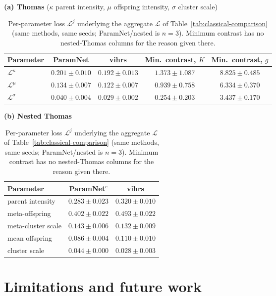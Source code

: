 \documentclass[11pt,a4paper]{article}
\begin{document}
\begin{table}[tbp]
\centering
\small
\textbf{(a) Thomas} ($\kappa$ parent intensity, $\mu$ offspring intensity, $\sigma$ cluster scale)\\[2pt]
\begin{tabular}{lcccc}
\toprule
Parameter & ParamNet & vihrs & Min.\ contrast, $K$ & Min.\ contrast, $g$ \\
\midrule
$\mathcal{L}^\kappa$ & $0.201 \pm 0.010$ & $0.192 \pm 0.013$ & $1.373 \pm 1.087$ & $8.825 \pm 0.485$ \\
$\mathcal{L}^\mu$    & $0.134 \pm 0.007$ & $0.122 \pm 0.007$ & $0.939 \pm 0.758$ & $6.334 \pm 0.370$ \\
$\mathcal{L}^\sigma$ & $0.040 \pm 0.004$ & $0.029 \pm 0.002$ & $0.254 \pm 0.203$ & $3.437 \pm 0.170$ \\
\bottomrule
\end{tabular}

\vspace{10pt}
\textbf{(b) Nested Thomas}\\[2pt]
\begin{tabular}{lcc}
\toprule
Parameter & ParamNet$^{c}$ & vihrs \\
\midrule
parent intensity      & $0.283 \pm 0.023$ & $0.320 \pm 0.010$ \\
meta-offspring        & $0.402 \pm 0.022$ & $0.493 \pm 0.022$ \\
meta-cluster scale    & $0.143 \pm 0.006$ & $0.132 \pm 0.009$ \\
mean offspring        & $0.086 \pm 0.004$ & $0.110 \pm 0.010$ \\
cluster scale         & $0.044 \pm 0.000$ & $0.028 \pm 0.003$ \\
\bottomrule
\end{tabular}
\caption{Per-parameter loss $\mathcal{L}^j$ underlying the aggregate
$\mathcal{L}$ of Table~\ref{tab:classical-comparison} (same methods, same
seeds; ParamNet/nested is $n{=}3$). Minimum contrast has no nested-Thomas
columns for the reason given there.}
\label{tab:perparam}
\end{table}

\newpage

\section{Limitations and future work}
\label{sec:future}
\end{document}
